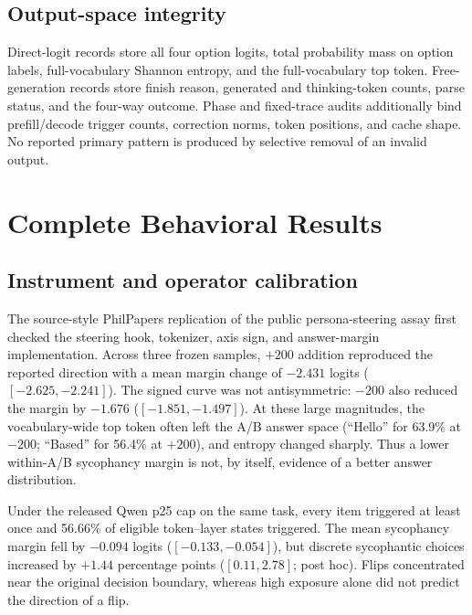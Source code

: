 \documentclass[letterpaper]{article}
\begin{document}
\subsection{Output-space integrity}

Direct-logit records store all four option logits, total probability mass on option labels, full-vocabulary Shannon entropy, and the full-vocabulary top token.  Free-generation records store finish reason, generated and thinking-token counts, parse status, and the four-way outcome.  Phase and fixed-trace audits additionally bind prefill/decode trigger counts, correction norms, token positions, and cache shape.  No reported primary pattern is produced by selective removal of an invalid output.

\section{Complete Behavioral Results}
\label{supp:behavior}

\subsection{Instrument and operator calibration}

The source-style PhilPapers replication of the public persona-steering assay \citep{kelkar2026devil} first checked the steering hook, tokenizer, axis sign, and answer-margin implementation.  Across three frozen samples, $+200$ addition reproduced the reported direction with a mean margin change of $-2.431$ logits ($[-2.625,-2.241]$).  The signed curve was not antisymmetric: $-200$ also reduced the margin by $-1.676$ ($[-1.851,-1.497]$).  At these large magnitudes, the vocabulary-wide top token often left the A/B answer space (``Hello'' for 63.9\% at $-200$; ``Based'' for 56.4\% at $+200$), and entropy changed sharply.  Thus a lower within-A/B sycophancy margin is not, by itself, evidence of a better answer distribution.

Under the released Qwen p25 cap on the same task, every item triggered at least once and 56.66\% of eligible token--layer states triggered.  The mean sycophancy margin fell by $-0.094$ logits ($[-0.133,-0.054]$), but discrete sycophantic choices increased by $+1.44$ percentage points ($[0.11,2.78]$; post hoc).  Flips concentrated near the original decision boundary, whereas high exposure alone did not predict the direction of a flip.
\end{document}
